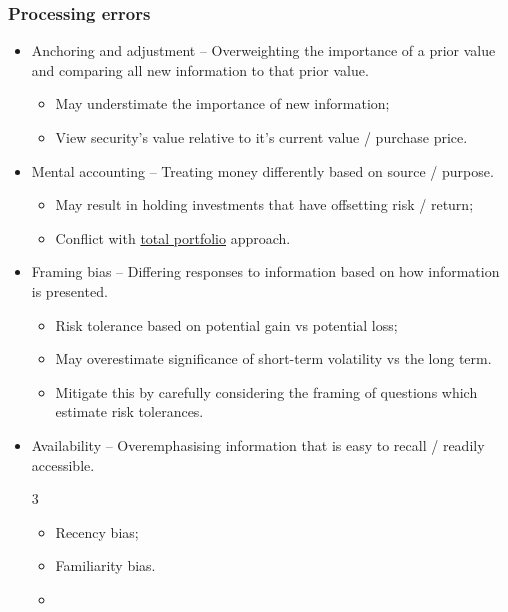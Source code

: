 \documentclass[../notes_compiled.tex]{subfiles}
\begin{document}
\begin{itemize}
\subsubsection*{Processing errors}
\begin{itemize}
\item Anchoring and adjustment -- Overweighting the importance of a prior value and comparing all new information to that prior value.
\begin{itemize}
\item May understimate the importance of new information;
\item View security’s value relative to it’s current value / purchase price.
\end{itemize}
\item Mental accounting -- Treating money differently based on source / purpose.
\begin{itemize}
\item May result in holding investments that have offsetting risk / return;
\item Conflict with \underline{total portfolio} approach.
\end{itemize}
\item Framing bias -- Differing responses to information based on how information is presented.
\begin{itemize}
\item Risk tolerance based on potential gain vs potential loss;
\item May overestimate significance of short-term volatility vs the long term.
\item[] Mitigate this by carefully considering the framing of questions which estimate risk tolerances.
\end{itemize}
\item Availability -- Overemphasising information that is easy to recall / readily accessible.
\begin{multicols}{3}
\begin{itemize}
\item Recency bias;
\item Familiarity bias.
\item[]
\end{itemize}
\end{multicols}
\end{itemize}

\end{itemize}
\end{document}

